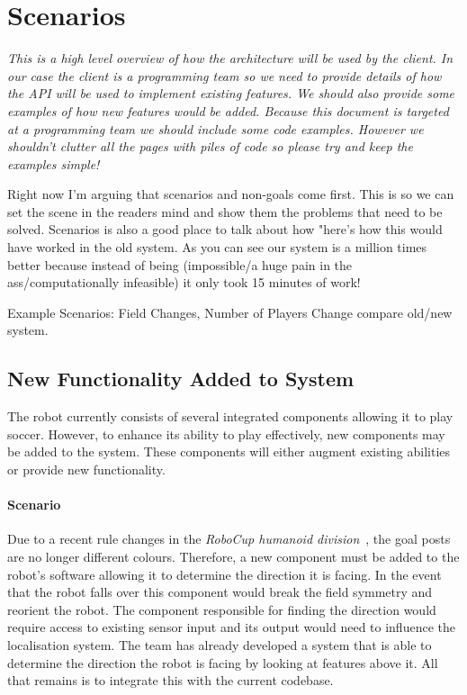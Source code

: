 \documentclass[english,12pt]{scrartcl}
\begin{document}
	\section{Scenarios}
		{\em %
		This is a high level overview of how the architecture will be used by the client. In our
		case the client is a programming team so we need to provide details of how the API will be
		used to implement existing features. We should also provide some examples of how new
		features would be added. Because this document is targeted at a programming team we should
		include some code examples. However we shouldn't clutter all the pages with piles of code so
		please try and keep the examples simple!

		Right now I'm arguing that scenarios and non-goals come first. This is so we can set the
		scene in the readers mind and show them the problems that need to be solved. Scenarios is
		also a good place to talk about how "here's how this would have worked in the old system. As
		you can see our system is a million times better because instead of being (impossible/a huge
		pain in the ass/computationally infeasible) it only took 15 minutes of work!

		Example Scenarios: Field Changes, Number of Players Change compare old/new system.
		}

		\subsection{New Functionality Added to System}
			The robot currently consists of several integrated components allowing it to play soccer.
			However, to enhance its ability to play effectively, new components may be added to the system.
			These components will either augment existing abilities or provide new functionality.

			\paragraph{Scenario} Due to a recent rule changes in the 
			\emph{RoboCup humanoid division}~\cite[Section 1.2]{humanoid2013rules}, the goal posts are no longer different colours.
			Therefore, a new component must be added to the robot's software allowing it to determine the
			direction it is facing. In the event that the robot falls over this component would break the
			field symmetry and reorient the robot. The component responsible for finding the direction would
			require access to existing sensor input and its output would need to influence the localisation
			system. The team has already developed a system that is able to determine the direction the
			robot is facing by looking at features above it. All that remains is to integrate this with the current codebase.
\end{document}
